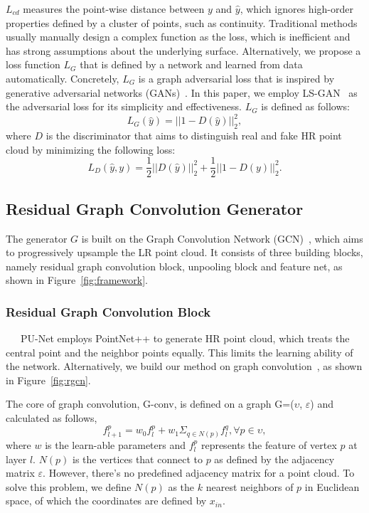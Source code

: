 \documentclass[10pt,twocolumn,letterpaper]{article}
\begin{document}
$L_{cd}$ measures the point-wise distance between $y$ and $\hat{y}$, which ignores high-order properties defined by a cluster of points, such as continuity.
Traditional methods usually manually design a complex function as the loss, which is inefficient and has strong assumptions about the underlying surface.
Alternatively, we propose a loss function $L_G$ that is defined by a network and learned from data automatically.
Concretely, $L_G$ is a graph adversarial loss that is inspired by generative adversarial networks (GANs)~\cite{goodfellow2014generative}.
In this paper, we employ LS-GAN~\cite{mao2017least} as the adversarial loss for its simplicity and effectiveness.
$L_G$ is defined as follows:
\begin{equation}
    L_G(\hat{y}) = ||1 - D(\hat{y})||_2^2, 
\end{equation}
where $D$ is the discriminator that aims to distinguish real and fake HR point cloud by minimizing the following loss:
\begin{equation}
    L_D(\hat{y}, y) = \frac{1}{2}||D(\hat{y})||_2^2 + \frac{1}{2}||1 - D(y)||_2^2.
\end{equation}

\subsection{Residual Graph Convolution Generator}
The generator $G$ is built on the Graph Convolution Network (GCN)~\cite{bronstein2017geometric}, which aims to progressively upsample the LR point cloud.
It consists of three building blocks, namely residual graph convolution block, unpooling block and feature net, as shown in Figure~\ref{fig:framework}.

\subsubsection{Residual Graph Convolution Block}
~~~PU-Net employs PointNet++ to generate HR point cloud, which treats the central point and the neighbor points equally.
This limits the learning ability of the network.
Alternatively, we build our method on graph convolution~\cite{bronstein2017geometric}, as shown in Figure~\ref{fig:rgcn}.

The core of graph convolution, G-conv, is defined on a graph G=($\upsilon$, $\varepsilon$) and calculated as follows,
\begin{equation}
    f^p_{l+1} = w_0f^p_l + w_1\Sigma_{q\in N(p)}f^q_l, \forall p \in \upsilon,
\end{equation}
where $w$ is the learn-able parameters and $f^p_l$ represents the feature of vertex $p$ at layer $l$.
$N(p)$ is the vertices that connect to $p$ as defined by the adjacency matrix $\varepsilon$.
However, there's no predefined adjacency matrix for a point cloud.
To solve this problem, we define $N(p)$ as the $k$ nearest neighbors of $p$ in Euclidean space, of which the coordinates are defined by $x_{in}$.
\end{document}
